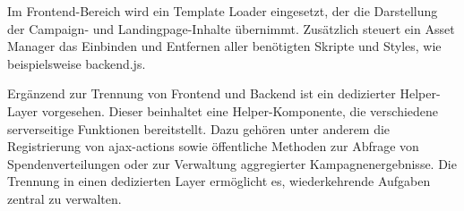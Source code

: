 Im Frontend-Bereich wird ein Template Loader eingesetzt, der die Darstellung der Campaign- und Landingpage-Inhalte übernimmt.
Zusätzlich steuert ein Asset Manager das Einbinden und Entfernen aller benötigten Skripte und Styles, wie beispielsweise backend.js.

Ergänzend zur Trennung von Frontend und Backend ist ein dedizierter Helper-Layer vorgesehen.
Dieser beinhaltet eine Helper-Komponente, die verschiedene serverseitige Funktionen bereitstellt.
Dazu gehören unter anderem die Registrierung von \gls{ajax}-\glspl{action} sowie öffentliche Methoden zur Abfrage von Spendenverteilungen oder zur Verwaltung aggregierter Kampagnenergebnisse.
Die Trennung in einen dedizierten Layer ermöglicht es, wiederkehrende Aufgaben zentral zu verwalten.


%
